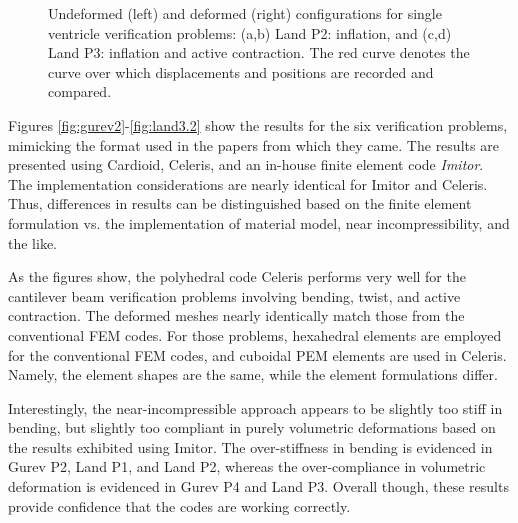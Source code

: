 \begin{figure}[ht]
{\label{fig:ventricles3}}		
%
\caption{Undeformed (left) and deformed (right) configurations for single ventricle verification problems: (a,b) Land P2: inflation, and (c,d) Land P3: inflation and active contraction. The red curve denotes the curve over which displacements and positions are recorded and compared.}
\label{fig:ventricles}
\end{figure}

Figures \ref*{fig:gurev2}-\ref*{fig:land3.2} show the results for the six verification problems, mimicking the format used in the papers from which they came. The results are presented using Cardioid, Celeris, and an in-house finite element code \textit{Imitor}. The implementation considerations are nearly identical for Imitor and Celeris. Thus, differences in results can be distinguished based on the finite element formulation vs. the implementation of material model, near incompressibility, and the like.

As the figures show, the polyhedral code Celeris performs very well for the cantilever beam verification problems involving bending, twist, and active contraction. The deformed meshes nearly identically match those from the conventional FEM codes. For those problems, hexahedral elements are employed for the conventional FEM codes, and cuboidal PEM elements are used in Celeris. Namely, the element shapes are the same, while the element formulations differ.

Interestingly, the near-incompressible approach appears to be slightly too stiff in bending, but slightly too compliant in purely volumetric deformations based on the results exhibited using Imitor. The over-stiffness in bending is evidenced in Gurev P2, Land P1, and Land P2, whereas the over-compliance in volumetric deformation is evidenced in Gurev P4 and Land P3. Overall though, these results provide confidence that the codes are working correctly. 

